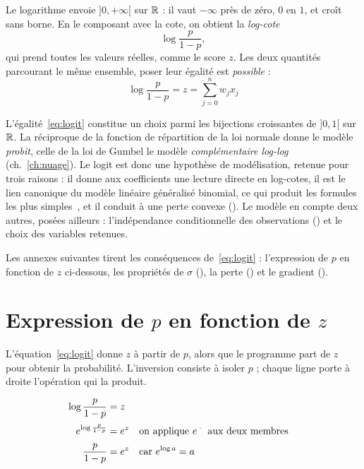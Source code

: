 Le logarithme envoie $]0,+\infty[$ sur $\mathbb{R}$ : il vaut $-\infty$ près de zéro,
$0$ en $1$, et croît sans borne. En le composant avec la cote, on obtient la
\emph{log-cote}
\[
  \log\frac{p}{1-p},
\]
qui prend toutes les valeurs réelles, comme le score $z$. Les deux quantités
parcourant le même ensemble, poser leur égalité est \emph{possible} :
\begin{equation}
  \boxed{\;\log\frac{p}{1-p}=z=\sum_{j=0}^{n}w_jx_j\;}
  \tag{$\star$}\label{eq:logit}
\end{equation}

L'égalité~\eqref{eq:logit} constitue un choix parmi les bijections croissantes
de $]0,1[$ sur $\mathbb{R}$. La réciproque de la fonction de
répartition de la loi normale donne le modèle \emph{probit}, celle de la loi de
Gumbel le modèle \emph{complémentaire log-log} (ch.~\ref{ch:nuage}). Le logit est
donc une hypothèse de modélisation, retenue pour trois raisons : il donne aux
coefficients une lecture directe en log-cotes, il est le lien canonique du modèle
linéaire généralisé binomial, ce qui produit les formules les plus
simples~\cite{mccullagh1989}, et il conduit à une perte convexe
(). Le modèle en compte deux autres, posées ailleurs :
l'indépendance conditionnelle des observations () et le choix
des variables retenues.

Les annexes suivantes tirent les conséquences de~\eqref{eq:logit} : l'expression
de $p$ en fonction de $z$ ci-dessous, les propriétés de $\sigma$
(), la perte () et le gradient
().

\section{Expression de \texorpdfstring{$p$}{p} en fonction de \texorpdfstring{$z$}{z}}

L'équation~\eqref{eq:logit} donne $z$ à partir de $p$, alors que le programme
part de $z$ pour obtenir la probabilité. L'inversion consiste à isoler $p$ ;
chaque ligne porte à droite l'opération qui la produit.

\begin{align}
  \log\frac{p}{1-p} &= z \notag\\[2pt]
  e^{\log\frac{p}{1-p}} &= e^{z}
    &&\text{on applique } e^{\;\cdot\;} \text{ aux deux membres} \notag\\[2pt]
  \frac{p}{1-p} &= e^{z}
    &&\text{car } e^{\log a}=a \notag\\[2pt]
\end{align}

